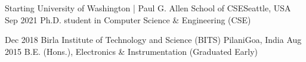 \begin{educations}
\education
    {Starting}   {University of Washington | Paul G. Allen School of CSE}{Seattle, USA}{}
    {Sep 2021} {Ph.D. student in Computer Science \& Engineering  (CSE)
    }
    
 \emptySeparator
  \education
    {Dec 2018}   {Birla Institute of Technology and Science (BITS) Pilani}{Goa, India}{}
    {Aug 2015} {B.E. (Hons.), Electronics \& Instrumentation (Graduated Early)}
\end{educations}
\vspace{-3mm}
